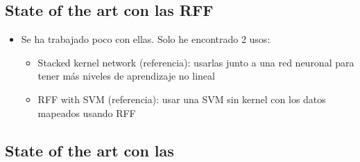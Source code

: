 %
%
%
%
\BoxesFigure
\begin{note}
  \subsection{State of the art con las RFF}
\end{note}
\begin{note}
  \begin{itemize}
    \item Se ha trabajado poco con ellas. Solo he encontrado 2 usos:
    \begin{itemize}
      \item Stacked kernel network (referencia): usarlas junto a una red
      neuronal para tener más niveles de aprendizaje no lineal
      \item RFF with SVM (referencia): usar una SVM sin kernel con los datos
      mapeados usando RFF
    \end{itemize}
  \end{itemize}
\end{note}
\begin{note}
  \subsection{State of the art con las \Nys}
\end{note}


